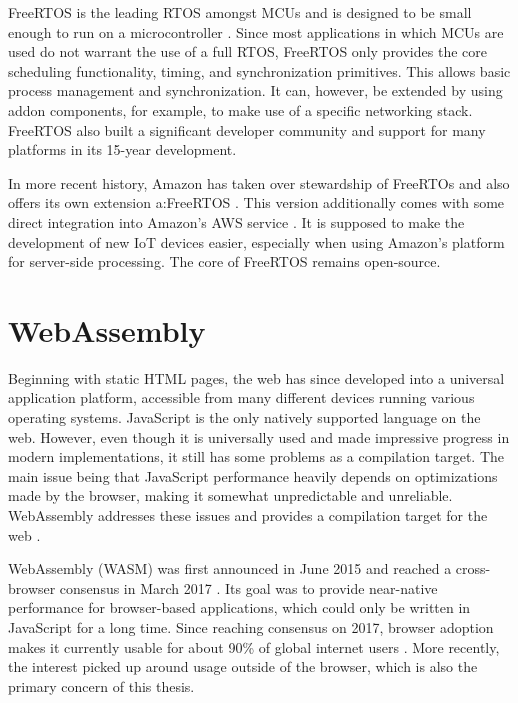 FreeRTOS is the leading RTOS amongst MCUs and is designed to be small enough to run on a microcontroller \autocite{noauthor_freertos_nodate}. Since most applications in which MCUs are used do not warrant the use of a full RTOS, FreeRTOS only provides the core scheduling functionality, timing, and synchronization primitives. This allows basic process management and synchronization. It can, however, be extended by using addon components, for example, to make use of a specific networking stack. FreeRTOS also built a significant developer community and support for many platforms in its 15-year development.

In more recent history, Amazon has taken over stewardship of FreeRTOs and also offers its own extension a:FreeRTOS \autocite{lardinois_amazon_nodate}. This version additionally comes with some direct integration into Amazon's AWS service \autocite{noauthor_freertos_nodate-1}. It is supposed to make the development of new IoT devices easier, especially when using Amazon's platform for server-side processing. The core of FreeRTOS remains open-source.

\section{WebAssembly}\label{sec:b_wasm}

Beginning with static HTML pages, the web has since developed into a universal application platform, accessible from many different devices running various operating systems. JavaScript is the only natively supported language on the web. However, even though it is universally used and made impressive progress in modern implementations, it still has some problems as a compilation target. The main issue being that JavaScript performance heavily depends on optimizations made by the browser, making it somewhat unpredictable and unreliable. WebAssembly addresses these issues and provides a compilation target for the web \autocite{mdn_contributors_webassembly_nodate}.

WebAssembly (WASM) was first announced in June 2015 \autocite{wagner_webassembly_2015} and reached a cross-browser consensus in March 2017 \autocite{wagner_webassembly_2017-1}. Its goal was to provide near-native performance for browser-based applications, which could only be written in JavaScript for a long time. Since reaching consensus on 2017, browser adoption makes it currently usable for about 90\% of global internet users \autocite{deveria_can_nodate}. More recently, the interest picked up around usage outside of the browser, which is also the primary concern of this thesis.

